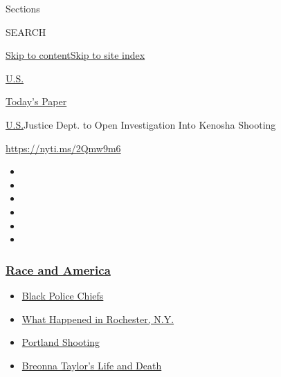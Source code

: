 Sections

SEARCH

\protect\hyperlink{site-content}{Skip to
content}\protect\hyperlink{site-index}{Skip to site index}

\href{https://www.nytimes3xbfgragh.onion/section/us}{U.S.}

\href{https://myaccount.nytimes3xbfgragh.onion/auth/login?response_type=cookie\&client_id=vi}{}

\href{https://www.nytimes3xbfgragh.onion/section/todayspaper}{Today's
Paper}

\href{/section/us}{U.S.}\textbar{}Justice Dept. to Open Investigation
Into Kenosha Shooting

\url{https://nyti.ms/2Qmw9m6}

\begin{itemize}
\item
\item
\item
\item
\item
\item
\end{itemize}

\hypertarget{race-and-america}{%
\subsubsection{\texorpdfstring{\href{https://www.nytimes3xbfgragh.onion/news-event/george-floyd-protests-minneapolis-new-york-los-angeles?name=styln-george-floyd\&region=TOP_BANNER\&block=storyline_menu_recirc\&action=click\&pgtype=Article\&impression_id=a7969050-f52c-11ea-98f9-eba1273f4363\&variant=undefined}{Race
and America}}{Race and America}}\label{race-and-america}}

\begin{itemize}
\tightlist
\item
  \href{https://www.nytimes3xbfgragh.onion/2020/09/11/us/black-police-chiefs-reform.html?name=styln-george-floyd\&region=TOP_BANNER\&block=storyline_menu_recirc\&action=click\&pgtype=Article\&impression_id=a7969051-f52c-11ea-98f9-eba1273f4363\&variant=undefined}{Black
  Police Chiefs}
\item
  \href{https://www.nytimes3xbfgragh.onion/2020/09/04/nyregion/rochester-police-daniel-prude.html?name=styln-george-floyd\&region=TOP_BANNER\&block=storyline_menu_recirc\&action=click\&pgtype=Article\&impression_id=a7969052-f52c-11ea-98f9-eba1273f4363\&variant=undefined}{What
  Happened in Rochester, N.Y.}
\item
  \href{https://www.nytimes3xbfgragh.onion/2020/08/30/us/portland-shooting-explained.html?name=styln-george-floyd\&region=TOP_BANNER\&block=storyline_menu_recirc\&action=click\&pgtype=Article\&impression_id=a7969053-f52c-11ea-98f9-eba1273f4363\&variant=undefined}{Portland
  Shooting}
\item
  \href{https://www.nytimes3xbfgragh.onion/2020/08/30/us/breonna-taylor-police-killing.html?name=styln-george-floyd\&region=TOP_BANNER\&block=storyline_menu_recirc\&action=click\&pgtype=Article\&impression_id=a7969054-f52c-11ea-98f9-eba1273f4363\&variant=undefined}{Breonna
  Taylor's Life and Death}
\end{itemize}

